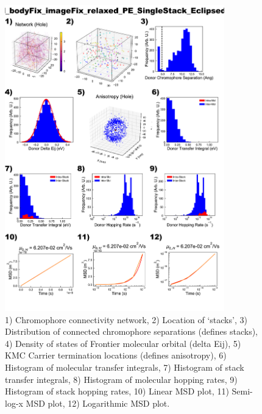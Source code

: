 \documentclass[12pt]{article}
\begin{document}
\begin{figure}[h]\centering
	\includegraphics[width=0.85\textwidth]{Figures/VRH_bodyFix_imageFix_relaxed_PE_SingleStack_Eclipsed_AA.png}
    \caption{   1) Chromophore connectivity network, 
                2) Location of `stacks', 
                3) Distribution of connected chromophore separations (defines stacks),
                4) Density of states of Frontier molecular orbital (delta Eij),
                5) KMC Carrier termination locations (defines anisotropy),
                6) Histogram of molecular transfer integrals,
                7) Histogram of stack transfer integrals,
                8) Histogram of molecular hopping rates,
                9) Histogram of stack hopping rates,
                10) Linear MSD plot,
                11) Semi-log-x MSD plot,
                12) Logarithmic MSD plot.}
	\label{fig:VRHPESingEcl}
\end{figure}
\end{document}
